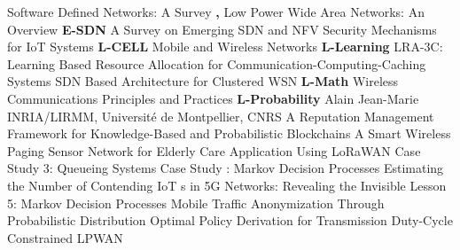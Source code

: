  \cite{masoudi_software_2016} Software Defined Networks: {{A}} Survey \newline 
\textbf{,} \newline  \cite{raza_low_2017} Low {{Power Wide Area Networks}}: {{An Overview}} \newline 
\textbf{E-SDN} \newline  \cite{farris_survey_2019} A {{Survey}} on {{Emerging SDN}} and {{NFV Security Mechanisms}} for {{IoT Systems}} \newline 
\textbf{L-CELL} \newline  \cite{pujolle_mobile_} Mobile and Wireless Networks \newline 
\textbf{L-Learning} \newline  \cite{wang_lra-3c_2019} {{LRA}}-{{3C}}: {{Learning Based Resource Allocation}} for {{Communication}}-{{Computing}}-{{Caching Systems}} \newline 
 \cite{olivier_sdn_2015} {{SDN Based Architecture}} for {{Clustered WSN}} \newline 
\textbf{L-Math} \newline  \cite{theodore_wireless_2002} Wireless Communications Principles and Practices \newline 
\textbf{L-Probability} \newline  \cite{jean-marie_alain_nodate} Alain {{Jean}}-{{Marie INRIA}}/{{LIRMM}}, {{Université}} de {{Montpellier}}, {{CNRS}} \newline 
 \cite{salman_reputation_2019} A {{Reputation Management Framework}} for {{Knowledge}}-{{Based}} and {{Probabilistic Blockchains}} \newline 
 \cite{yang_smart_2018} A {{Smart Wireless Paging Sensor Network}} for {{Elderly Care Application Using LoRaWAN}} \newline 
 \cite{jean-marie_case_nodate} Case {{Study}} 3: {{Queueing Systems}} \newline 
 \cite{hyon_case_nodate} Case Study : {{Markov Decision Processes}} \newline 
 \cite{bouzouita_estimating_2018} Estimating the Number of Contending {{IoT}} s in {{5G}} Networks: {{Revealing}} the Invisible \newline 
 \cite{hyon_lesson_nodate} Lesson 5: {{Markov Decision Processes}} \newline 
 \cite{chaddad_mobile_2019} Mobile {{Traffic Anonymization Through Probabilistic Distribution}} \newline 
 \cite{sandoval_optimal_2018} Optimal Policy Derivation for {{Transmission Duty}}-{{Cycle}} Constrained {{LPWAN}} \newline 
